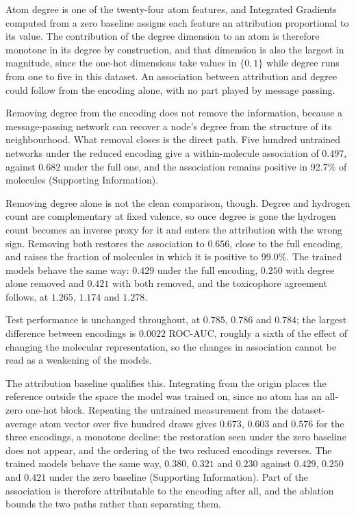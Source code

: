 \documentclass[journal=jcisd8,manuscript=suppinfo]{achemso}
\begin{document}
Atom degree is one of the twenty-four atom features, and Integrated Gradients computed from a
zero baseline assigns each feature an attribution proportional to its value. The contribution
of the degree dimension to an atom is therefore monotone in its degree by construction, and
that dimension is also the largest in magnitude, since the one-hot dimensions take values in
$\{0,1\}$ while degree runs from one to five in this dataset. An association between attribution and degree
could follow from the encoding alone, with no part played by message passing.

Removing degree from the encoding does not remove the information, because a message-passing
network can recover a node's degree from the structure of its neighbourhood. What removal
closes is the direct path. Five hundred untrained networks under the reduced encoding give a
within-molecule association of $0.497$, against $0.682$ under the full one, and the
association remains positive in 92.7\% of molecules (Supporting Information).

Removing degree alone is not the clean comparison, though. Degree and hydrogen count are
complementary at fixed valence, so once degree is gone the hydrogen count becomes an inverse
proxy for it and enters the attribution with the wrong sign. Removing both restores the
association to $0.656$, close to the full encoding, and
raises the fraction of molecules in which it is positive to 99.0\%. The trained models
behave the same way: $0.429$ under the full encoding, $0.250$ with degree alone removed and
$0.421$ with both removed, and the toxicophore agreement follows, at $1.265$, $1.174$ and
$1.278$.

Test performance is unchanged throughout, at $0.785$, $0.786$ and $0.784$; the largest
difference between encodings is $0.0022$ ROC-AUC, roughly a sixth of the effect of changing
the molecular representation, so the changes in association cannot be read as a weakening of the
models.


The attribution baseline qualifies this. Integrating from the origin places the reference
outside the space the model was trained on, since no atom has an all-zero one-hot block.
Repeating the untrained measurement from the dataset-average atom vector over five hundred
draws gives $0.673$, $0.603$ and $0.576$ for the three encodings, a monotone decline: the
restoration seen under the zero baseline does not appear, and the ordering of the two reduced
encodings reverses. The trained models behave the same way, $0.380$, $0.321$ and $0.230$
against $0.429$, $0.250$ and $0.421$ under the zero baseline (Supporting Information). Part
of the association is therefore attributable to the encoding after all, and the ablation
bounds the two paths rather than separating them.
\end{document}
